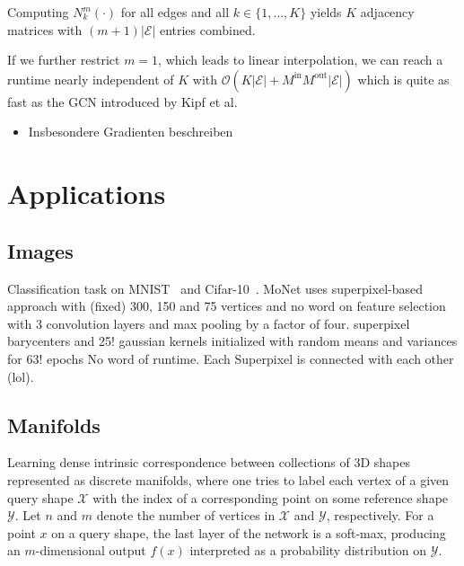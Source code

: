\documentclass[pdftex,10pt,a4paper]{scrartcl}
\begin{document}
Computing $N_k^m(\cdot)$ for all edges and all $k \in \{ 1, \ldots, K \}$ yields $K$ adjacency matrices with $(m + 1) |\mathcal{E}|$ entries combined.

If we further restrict $m = 1$, which leads to linear interpolation, we can reach a runtime nearly independent of $K$ with $\mathcal{O}(K |\mathcal{E}| + M^{\mathrm{in}} M^{\mathrm{out}} |\mathcal{E}|)$ which is quite as fast as the GCN introduced by Kipf et al.



\begin{itemize}
  \item Insbesondere Gradienten beschreiben
\end{itemize}

\section{Applications}

\subsection{Images}

Classification task on MNIST~\cite{mnist} and Cifar-10~\cite{cifar10}.
MoNet uses superpixel-based approach with (fixed) 300, 150 and 75 vertices and no word on feature selection with 3 convolution layers and max pooling by a factor of four.
superpixel barycenters and 25! gaussian kernels initialized with random means and variances for 63! epochs
No word of runtime.
Each Superpixel is connected with each other (lol).

\subsection{Manifolds}

Learning dense intrinsic correspondence between collections of 3D shapes represented as discrete manifolds, where one tries to label each vertex of a given query shape $\mathcal{X}$ with the index of a corresponding point on some reference shape $\mathcal{Y}$.
Let $n$ and $m$ denote the number of vertices in $\mathcal{X}$ and $\mathcal{Y}$, respectively.
For a point $x$ on a query shape, the last layer of the network is a soft-max, producing an $m$-dimensional output $f(x)$ interpreted as a probability distribution on $\mathcal{Y}$.
\end{document}
